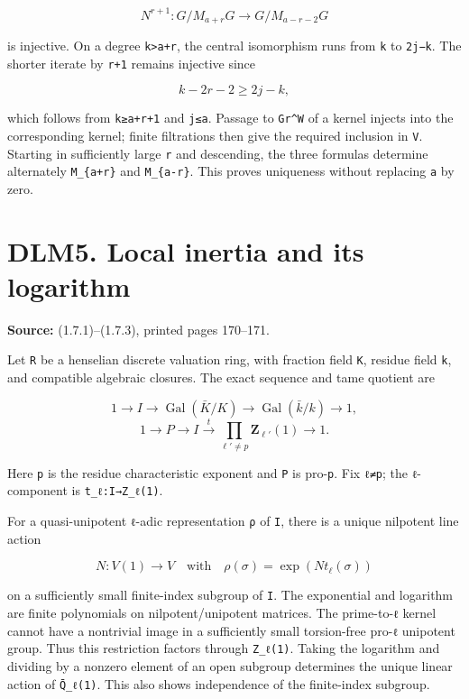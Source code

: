 \documentclass[
]{report}
\begin{document}
\[
N^{r+1}:G/M_{a+r}G\longrightarrow G/M_{a-r-2}G
\]

is injective. On a degree \texttt{k\textgreater{}a+r}, the central
isomorphism runs from \texttt{k} to \texttt{2j−k}. The shorter iterate
by \texttt{r+1} remains injective since

\[
k-2r-2\ge 2j-k,
\]

which follows from \texttt{k≥a+r+1} and \texttt{j≤a}. Passage to
\texttt{Gr\^{}W} of a kernel injects into the corresponding kernel;
finite filtrations then give the required inclusion in \texttt{V}.
Starting in sufficiently large \texttt{r} and descending, the three
formulas determine alternately \texttt{M\_\{a+r\}} and
\texttt{M\_\{a-r\}}. This proves uniqueness without replacing \texttt{a}
by zero.

\section{DLM5. Local inertia and its
logarithm}\label{dlm5.-local-inertia-and-its-logarithm}

\textbf{Source:} (1.7.1)--(1.7.3), printed pages 170--171.

Let \texttt{R} be a henselian discrete valuation ring, with fraction
field \texttt{K}, residue field \texttt{k}, and compatible algebraic
closures. The exact sequence and tame quotient are

\[
1\to I\to\operatorname{Gal}(\bar K/K)\to\operatorname{Gal}(\bar k/k)\to1,
\] \[
1\to P\to I\xrightarrow{t}\prod_{\ell'\ne p}\mathbf Z_{\ell'}(1)\to1.
\tag{DLM5.1}
\]

Here \texttt{p} is the residue characteristic exponent and \texttt{P} is
pro-\texttt{p}. Fix \texttt{ℓ≠p}; the \texttt{ℓ}-component is
\texttt{t\_ℓ:I→Z\_ℓ(1)}.

For a quasi-unipotent \texttt{ℓ}-adic representation \texttt{ρ} of
\texttt{I}, there is a unique nilpotent line action

\[
N:V(1)\longrightarrow V
\quad\text{with}\quad
\rho(\sigma)=\exp(Nt_\ell(\sigma))
\tag{DLM5.2}
\]

on a sufficiently small finite-index subgroup of \texttt{I}. The
exponential and logarithm are finite polynomials on nilpotent/unipotent
matrices. The prime-to-\texttt{ℓ} kernel cannot have a nontrivial image
in a sufficiently small torsion-free pro-\texttt{ℓ} unipotent group.
Thus this restriction factors through \texttt{Z\_ℓ(1)}. Taking the
logarithm and dividing by a nonzero element of an open subgroup
determines the unique linear action of \texttt{Q̄\_ℓ(1)}. This also shows
independence of the finite-index subgroup.
\end{document}
